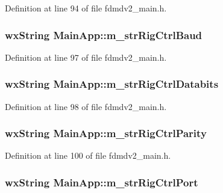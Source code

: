 Definition at line 94 of file fdmdv2\-\_\-main.\-h.

\hypertarget{class_main_app_af367d4403e54c973f3b5d9708ac42318}{
\subsubsection[{m\-\_\-str\-Rig\-Ctrl\-Baud}]{\setlength{\rightskip}{0pt plus 5cm}wx\-String Main\-App\-::m\-\_\-str\-Rig\-Ctrl\-Baud}}\label{class_main_app_af367d4403e54c973f3b5d9708ac42318}


Definition at line 97 of file fdmdv2\-\_\-main.\-h.

\hypertarget{class_main_app_a5ee4f9e7aed236fdf885442d5accf37f}{
\subsubsection[{m\-\_\-str\-Rig\-Ctrl\-Databits}]{\setlength{\rightskip}{0pt plus 5cm}wx\-String Main\-App\-::m\-\_\-str\-Rig\-Ctrl\-Databits}}\label{class_main_app_a5ee4f9e7aed236fdf885442d5accf37f}


Definition at line 98 of file fdmdv2\-\_\-main.\-h.

\hypertarget{class_main_app_ab61a6ceb5655721d22b71a28fbe4aab2}{
\subsubsection[{m\-\_\-str\-Rig\-Ctrl\-Parity}]{\setlength{\rightskip}{0pt plus 5cm}wx\-String Main\-App\-::m\-\_\-str\-Rig\-Ctrl\-Parity}}\label{class_main_app_ab61a6ceb5655721d22b71a28fbe4aab2}


Definition at line 100 of file fdmdv2\-\_\-main.\-h.

\hypertarget{class_main_app_ab191e22c827be40319221b07b0afc91e}{
\subsubsection[{m\-\_\-str\-Rig\-Ctrl\-Port}]{\setlength{\rightskip}{0pt plus 5cm}wx\-String Main\-App\-::m\-\_\-str\-Rig\-Ctrl\-Port}}\label{class_main_app_ab191e22c827be40319221b07b0afc91e}


